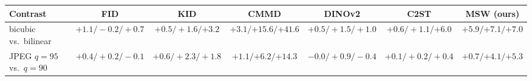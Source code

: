 \begin{tabular}{lcccccc}
\toprule
Contrast & FID & KID & CMMD & DINOv2 & C2ST & MSW (ours) \\
\midrule
bicubic vs.\ bilinear & $+1.1/-0.2/+0.7$ & $+0.5/+1.6/\mathbf{+3.2}$ & $\mathbf{+3.1}/\mathbf{+15.6}/\mathbf{+41.6}$ & $+0.5/+1.5/+1.0$ & $+0.6/+1.1/\mathbf{+6.0}$ & $\mathbf{+5.9}/\mathbf{+7.1}/\mathbf{+7.0}$ \\
JPEG $q{=}95$ vs.\ $q{=}90$ & $+0.4/+0.2/-0.1$ & $+0.6/+2.3/+1.8$ & $+1.1/\mathbf{+6.2}/\mathbf{+14.3}$ & $-0.0/+0.9/-0.4$ & $+0.1/+0.2/+0.4$ & $+0.7/\mathbf{+4.1}/\mathbf{+5.3}$ \\
\bottomrule
\end{tabular}
